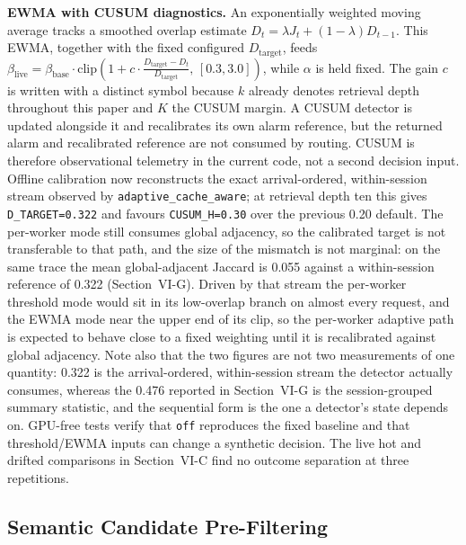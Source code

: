 \documentclass[conference]{IEEEtran}
\begin{document}
\textbf{EWMA with CUSUM diagnostics.} An exponentially weighted moving average
tracks a smoothed overlap estimate $D_t = \lambda J_t + (1-\lambda)
D_{t-1}$. This EWMA, together with the fixed configured
$D_{\text{target}}$, feeds
$\beta_{\text{live}} = \beta_{\text{base}} \cdot \text{clip}\!\left(1 +
c\cdot\frac{D_{\text{target}} - D_t}{D_{\text{target}}},\,
[0.3, 3.0]\right)$, while $\alpha$ is held fixed. The gain $c$ is written
with a distinct symbol because $k$ already denotes retrieval depth
throughout this paper and $K$ the CUSUM margin. A CUSUM detector is
updated alongside it and recalibrates its own alarm reference, but the
returned alarm and recalibrated reference are not consumed by routing.
CUSUM is therefore observational telemetry in the current code, not a
second decision input. Offline calibration now reconstructs the exact
arrival-ordered, within-session stream observed by
\texttt{adaptive\_cache\_aware}; at retrieval depth ten this gives
\texttt{D\_TARGET=0.322} and favours \texttt{CUSUM\_H=0.30} over the
previous 0.20 default. The per-worker mode still consumes global
adjacency, so the calibrated target is not transferable to that path, and
the size of the mismatch is not marginal: on the same trace the mean
global-adjacent Jaccard is 0.055 against a within-session reference of
0.322 (Section~VI-G). Driven by that stream the per-worker threshold mode
would sit in its low-overlap branch on almost every request, and the EWMA
mode near the upper end of its clip, so the per-worker adaptive path is
expected to behave close to a fixed weighting until it is recalibrated
against global adjacency. Note also that the two figures are not two
measurements of one quantity: 0.322 is the arrival-ordered, within-session
stream the detector actually consumes, whereas the 0.476 reported in
Section~VI-G is the session-grouped summary statistic, and the sequential
form is the one a detector's state depends on.
GPU-free tests verify that \texttt{off} reproduces the fixed baseline
and that threshold/EWMA inputs can change a synthetic decision. The
live hot and drifted comparisons in Section~VI-C find no outcome
separation at three repetitions.

\subsection{Semantic Candidate Pre-Filtering}
\end{document}
